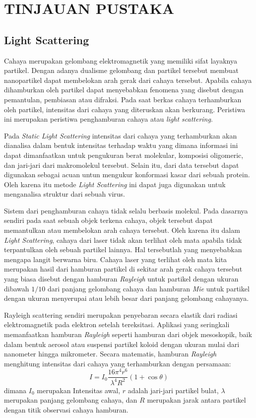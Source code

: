 \chapter{TINJAUAN PUSTAKA}

\section{Light Scattering}
Cahaya merupakan gelombang elektromagnetik yang memiliki sifat layaknya partikel. Dengan adanya
dualisme gelombang dan partikel tersebut membuat nanopartikel dapat membelokan arah gerak dari
cahaya tersebut. Apabila cahaya dihamburkan oleh partikel dapat menyebabkan fenomena yang disebut
dengan pemantulan, pembiasan atau difraksi. Pada saat berkas cahaya terhamburkan oleh partikel,
intensitas dari cahaya yang diteruskan akan berkurang. Peristiwa ini merupakan peristiwa penghamburan
cahaya atau \textit{light scattering}\cite{Black1996}.

Pada \textit{Static Light Scattering} intensitas dari cahaya yang terhamburkan  akan dianalisa dalam
bentuk intensitas terhadap waktu yang dimana informasi ini dapat dimanfaatkan untuk pengukuran berat
molekular, komposisi oligomeric, dan jari-jari dari makromolekul tersebut. Selain itu, dari data
tersebut dapat digunakan sebagai acuan untun mengukur konformasi kasar dari sebuah protein. Oleh
karena itu metode \textit{Light Scattering} ini dapat juga digunakan untuk menganalisa struktur dari
sebuah virus\cite{Stetefeld2016}.

Sistem dari penghamburan cahaya tidak selalu berbasis molekul. Pada dasarnya sendiri pada saat
sebuah objek terkena cahaya, objek tersebut dapat memantulkan atau membelokan arah cahaya tersebut.
Oleh karena itu dalam \textit{Light Scattering}, cahaya dari laser tidak akan terlihat oleh mata
apabila tidak terpantulkan oleh sebuah partikel lainnya. Hal tersebutlah yang menyebabkan mengapa
langit berwarna biru. Cahaya laser yang terlihat oleh mata kita merupakan hasil dari hamburan
partikel di sekitar arah gerak cahaya tersebut yang biasa disebut dengan hamburan
\textit{Rayleigh} untuk partikel dengan ukuran dibawah ${1/10}$ dari panjang gelombang cahaya
dan hamburan \textit{Mie} untuk partikel dengan ukuran menyerupai atau lebih besar dari
panjang gelombang cahayanya\cite{Zidan2022,Chew2019}.

Rayleigh scattering sendiri merupakan penyebaran secara elastik dari radiasi elektromagnetik
pada elektron setelah tereksitasi. Aplikasi yang seringkali memanfaatkan hamburan
\textit{Rayleigh} seperti hamburan dari objek mesoskopik, baik dalam bentuk aerosol atau
suspensi partikel koloid dengan ukuran mulai dari nanometer hingga mikrometer\cite{Piazza2005}.
Secara matematis, hamburan \textit{Rayleigh} menghitung intensitas dari cahaya yang terhamburkan
dengan persamaan:
\begin{equation}
    I = I_0 \frac{16 {\pi}^4 r^6}{\lambda^4 R^2} \left(1 + \cos \theta \right)
    \label{eq:rayleigh}
\end{equation}
\noindent
dimana ${I_0}$ merupakan Intensitas awal, ${r}$ adalah jari-jari partikel bulat, ${\lambda}$
merupakan panjang gelombang cahaya, dan ${R}$ merupakan jarak antara partikel dengan
titik observasi cahaya hamburan\cite{Thomas1991}.

